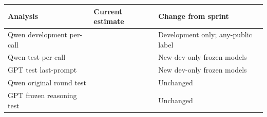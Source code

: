 \begin{tabular}{lll}
\toprule
Analysis & Current estimate & Change from sprint \\
\midrule
Qwen development per-call & \qwenCallProbe{} \qwenCallProbeCI{} & Development only; any-public label \\
Qwen test per-call & \qwenFreshCallProbe{} \qwenFreshCallProbeCI{} & New dev-only frozen models \\
GPT test last-prompt & \gptossFreshCallProbe{} \gptossFreshCallProbeCI{} & New dev-only frozen models \\
Qwen original round test & \qwenFreshNearProbe{} \qwenFreshNearProbeCI{} & Unchanged \\
GPT frozen reasoning test & \gptossFreshReasoning{} \gptossFreshReasoningCI{} & Unchanged \\
\bottomrule
\end{tabular}
